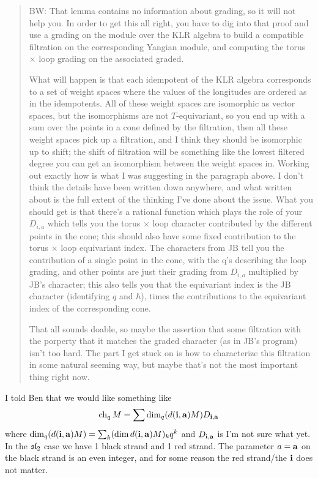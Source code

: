 \documentclass[11pt]{article}
\begin{document}
\begin{quotation}
    BW: That lemma contains no information about grading, so it will not help you. In order to get this all right, you have to dig into that proof and use a grading on the module over the KLR algebra to build a compatible filtration on the corresponding Yangian module, and computing the torus $\times$ loop grading on the associated graded.  

    What will happen is that each idempotent of the KLR algebra corresponds to a set of weight spaces where the values of the longitudes are ordered as in the idempotents. All of these weight spaces are isomorphic as vector spaces, but the isomorphisms are not $T$-equivariant, so you end up with a sum over the points in a cone defined by the filtration, then all these weight spaces pick up a filtration, and I think they should be isomorphic up to shift; the shift of filtration will be something like the lowest filtered degree you can get an isomorphism between the weight spaces in. Working out exactly how is what I was suggesting in the paragraph above. I don't think the details have been written down anywhere, and what written about is the full extent of the thinking I've done about the issue. What you should get is that there's a rational function which plays the role of your $D_{i,a}$ which tells you the torus $\times$ loop character contributed by the different points in the cone; this should also have some fixed contribution to the torus $\times$ loop equivariant index. The characters from JB tell you the contribution of a single point in the cone, with the q's describing the loop grading, and other points are just their grading from $D_{i,a}$ multiplied by JB's character; this also tells you that the equivariant index is the JB character (identifying $q$ and $\hbar$), times the contributions to the equivariant index of the corresponding cone. 

    That all sounds doable, so maybe the assertion that some filtration with the porperty that it matches the graded character (as in JB's program) isn't too hard. The part I get stuck on is how to characterize this filtration in some natural seeming way, but maybe that's not the most important thing right now. 
\end{quotation}

I told Ben that we would like something like
% 
\begin{equation}
    \ch_q M = \sum\dim_q (d(\vi,\va) M) D_{\vi,\va}  
\end{equation}
% 
where 
% 
$\dim_q (d(\vi,\va) M) = \sum_k (\dim d(\vi,\va) M)_k q^k$
% 
and 
% 
$D_{\vi,\va}$ is I’m not sure what yet. In the $\sl_2$ case we have 1 black strand and 1 red strand. The parameter $a = \va$ on the black strand is an even integer, and for some reason the red strand/the $\vi$ does not matter. 
\end{document}
